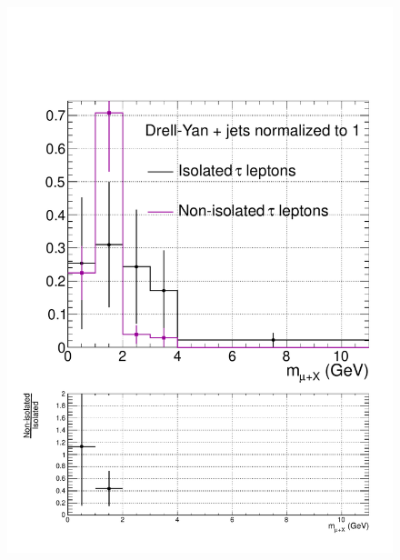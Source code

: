 \begin{figure}[hbtp]
  \begin{center}
    \includegraphics[width=0.8\cmsFigWidth]{figures/isoVsNonIsoTaus_DY_highMT_v87}

\end{center}
\end{figure}
